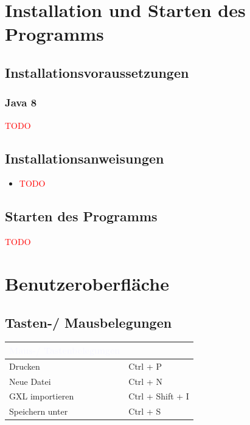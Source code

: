 \documentclass[enabledeprecatedfontcommands,fontsize=11pt,paper=a4,twoside]{scrartcl}
\newcommand*{\red}{\textcolor{red}}
\begin{document}
\newpage
\section{Installation und Starten des Programms} \label{sec:installation}

\subsection{Installationsvoraussetzungen}
\subsubsection{Java 8}
\red{TODO}

\subsection{Installationsanweisungen}
\begin{itemize}
	\item \red{TODO}
\end{itemize}
\subsection{Starten des Programms}
\red{TODO}

\newpage	
\section{Benutzeroberfläche}
\subsection{Tasten-/ Mausbelegungen}

\begin{tabular} {|p{8cm}|p{8cm}|}
	\hline
	\rowcolor{glaucous}\multicolumn{2}{|l|} {\parbox{16cm}{\textbf{\textcolor{ghostwhite}{Maus-/ Tastenbelegungen}}} } \\ \hline\hline 	
	Drucken	& Ctrl + P \\ \hline
	Neue Datei	& Ctrl + N \\ \hline
	GXL importieren	& Ctrl + Shift + I \\ \hline
	Speichern unter	&	Ctrl + S \\ \hline
\end{tabular}
\end{document}
